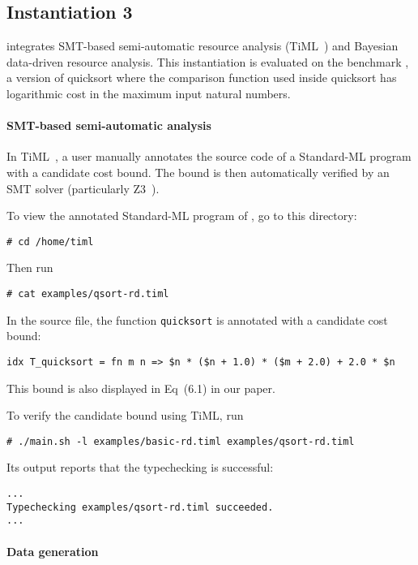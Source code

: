 \subsection{Instantiation 3}
\label{sec:step-by-step-instructions:instantiation-3}

 integrates SMT-based semi-automatic
resource analysis (TiML~\citep{WangWC17}) and Bayesian data-driven resource
analysis.
%
This instantiation is evaluated on the benchmark \quicksorttiml{}, a version of
quicksort where the comparison function used inside quicksort has logarithmic
cost in the maximum input natural numbers.

\paragraph{SMT-based semi-automatic analysis}

In TiML~\citep{WangWC17}, a user manually annotates the source code of a
Standard-ML program with a candidate cost bound.
%
The bound is then automatically verified by an SMT solver (particularly
Z3~\citep{DeMoura2008}).

To view the annotated Standard-ML program of \quicksorttiml{}, go to this
directory:
\begin{verbatim}
# cd /home/timl
\end{verbatim}
%
Then run
\begin{verbatim}
# cat examples/qsort-rd.timl
\end{verbatim}
%
In the source file, the function \texttt{quicksort} is annotated with a candidate cost bound:
\begin{verbatim}
idx T_quicksort = fn m n => $n * ($n + 1.0) * ($m + 2.0) + 2.0 * $n
\end{verbatim}
%
This bound is also displayed in Eq~(6.1) in our paper.

To verify the candidate bound using TiML, run
\begin{verbatim}
# ./main.sh -l examples/basic-rd.timl examples/qsort-rd.timl
\end{verbatim}
%
Its output reports that the typechecking is successful:
\begin{verbatim}
...
Typechecking examples/qsort-rd.timl succeeded.
...
\end{verbatim}

\paragraph{Data generation}

